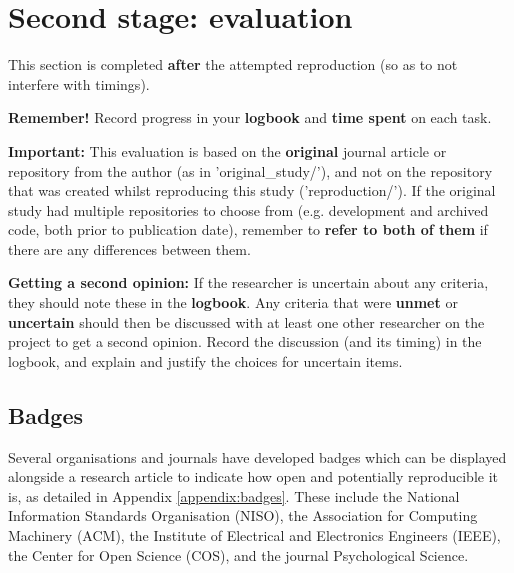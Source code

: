 \section{Second stage: evaluation}

This section is completed \textbf{after} the attempted reproduction (so as to not interfere with timings).

\textbf{Remember!} Record progress in your \textbf{logbook} and \textbf{time spent} on each task.

\textbf{Important:} This evaluation is based on the \textbf{original} journal article or repository from the author (as in 'original\_study/'), and not on the repository that was created whilst reproducing this study ('reproduction/'). If the original study had multiple repositories to choose from (e.g. development and archived code, both prior to publication date), remember to \textbf{refer to both of them} if there are any differences between them.

\textbf{Getting a second opinion:} If the researcher is uncertain about any criteria, they should note these in the \textbf{logbook}. Any criteria that were \textbf{unmet} or \textbf{uncertain} should then be discussed with at least one other researcher on the project to get a second opinion. Record the discussion (and its timing) in the logbook, and explain and justify the choices for uncertain items.

\vspace{0.5cm}
\subsection{Badges} \label{sec:badges}

Several organisations and journals have developed badges which can be displayed alongside a research article to indicate how open and potentially reproducible it is, as detailed in Appendix \ref{appendix:badges}. These include the National Information Standards Organisation (NISO),\autocite{association_for_computing_machinery_acm_artifact_2020} the Association for Computing Machinery (ACM),\autocite{association_for_computing_machinery_acm_artifact_2020} the Institute of Electrical and Electronics Engineers (IEEE),\autocite{institute_of_electrical_and_electronics_engineers_ieee_about_nodate} the Center for Open Science (COS)\autocite{blohowiak_badges_2023}, and the journal Psychological Science.\autocite{hardwicke_transparency_2023,association_for_psychological_science_aps_psychological_2023}

